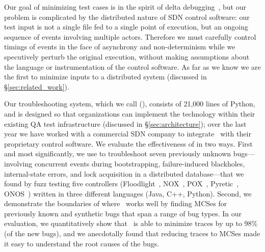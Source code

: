 Our goal of minimizing test cases is in the spirit of
delta debugging~\cite{Zeller:1999:YMP:318773.318946}, but our problem is
complicated by the distributed nature of SDN control software:
our test input is not a single file fed to a single point of execution, but an ongoing
sequence of events involving
multiple actors. Therefore we must carefully
control timings of events in the face of asynchrony and non-determinism
while we specutively perturb the original execution,
without making assumptions about the language
or instrumentation of the control software. %
As far as we know we are the first to minimize inputs to a distributed
system (discussed in \S\ref{sec:related_work}).

Our troubleshooting system, which we call {\projectname} ({\projectmeaning}),
consists of 21,000 lines of Python, and is designed so that organizations can
implement the technology within their existing QA test infrastructure (discussed in
\S\ref{sec:architecture}); over the last year we have worked with a
commercial SDN company to integrate \projectname~with their proprietary control
software. We evaluate the effectiveness of {\projectname} in
two ways. First and most significantly, we use {\projectname} to troubleshoot
seven previously unknown bugs---involving concurrent events during
bootstrapping, failure-induced blackholes, internal-state errors, and lock acquisition in a distributed database---that we found
by fuzz testing five controllers (Floodlight~\cite{floodlight}, NOX~\cite{nox},
POX~\cite{pox}, Pyretic~\cite{frenetic}, ONOS~\cite{ONOS})
written in three different languages (Java, C++, Python).
Second, we demonstrate the
boundaries of where \projectname~works well by
finding MCSes for previously known and synthetic bugs that span a range of bug
types. In our evaluation, we quantitatively show that \projectname~is able to
minimize traces by up to 98\% (of the new bugs), and we anecdotally found that reducing
traces to MCSes made it easy to understand the root causes of the bugs.
